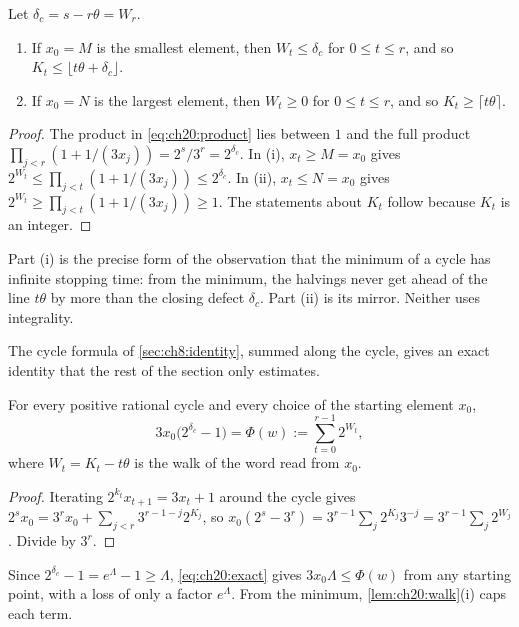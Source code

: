 \begin{lemma}\label{lem:ch20:walk}
Let $\delta_c=s-r\theta=W_r$.
\begin{enumerate}[label=(\roman*)]
\item If $x_0=M$ is the smallest element, then $W_t\le\delta_c$ for $0\le t\le r$, and so $K_t\le\lfloor t\theta+\delta_c\rfloor$.
\item If $x_0=N$ is the largest element, then $W_t\ge 0$ for $0\le t\le r$, and so $K_t\ge\lceil t\theta\rceil$.
\end{enumerate}
\end{lemma}

\begin{proof}
The product in \eqref{eq:ch20:product} lies between $1$ and the full product $\prod_{j<r}(1+1/(3x_j))=2^s/3^r=2^{\delta_c}$. In (i), $x_t\ge M=x_0$ gives $2^{W_t}\le\prod_{j<t}(1+1/(3x_j))\le 2^{\delta_c}$. In (ii), $x_t\le N=x_0$ gives $2^{W_t}\ge\prod_{j<t}(1+1/(3x_j))\ge 1$. The statements about $K_t$ follow because $K_t$ is an integer.
\end{proof}

Part (i) is the precise form of the observation that the minimum of a cycle has infinite stopping time: from the minimum, the halvings never get ahead of the line $t\theta$ by more than the closing defect $\delta_c$. Part (ii) is its mirror. Neither uses integrality.

The cycle formula of \cref{sec:ch8:identity}, summed along the cycle, gives an exact identity that the rest of the section only estimates.

\begin{theorem}\label{thm:ch20:exact}
For every positive rational cycle and every choice of the starting element $x_0$,
\begin{equation}\label{eq:ch20:exact}
3x_0\bigl(2^{\delta_c}-1\bigr)=\Phi(w):=\sum_{t=0}^{r-1}2^{W_t},
\end{equation}
where $W_t=K_t-t\theta$ is the walk of the word read from $x_0$.
\end{theorem}

\begin{proof}
Iterating $2^{k_t}x_{t+1}=3x_t+1$ around the cycle gives $2^sx_0=3^rx_0+\sum_{j<r}3^{r-1-j}2^{K_j}$, so $x_0(2^s-3^r)=3^{r-1}\sum_j2^{K_j}3^{-j}=3^{r-1}\sum_j2^{W_j}$. Divide by $3^r$.
\end{proof}

Since $2^{\delta_c}-1=e^{\Lambda}-1\ge\Lambda$, \eqref{eq:ch20:exact} gives $3x_0\Lambda\le\Phi(w)$ from any starting point, with a loss of only a factor $e^{\Lambda}$. From the minimum, \cref{lem:ch20:walk}(i) caps each term.

